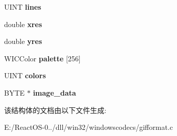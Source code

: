\begin{DoxyCompactItemize}
U\+I\+NT {\bfseries lines}
\item 
\mbox{\label{struct_gif_frame_encode_ab1c397b05cb033bc920f030285635e03}} 
double {\bfseries xres}
\item 
\mbox{\label{struct_gif_frame_encode_a4b5109bcaa15e3de41dbfead0dbe93da}} 
double {\bfseries yres}
\item 
\mbox{\label{struct_gif_frame_encode_a0ee0ee0d1065778152a1e1e5784e276a}} 
W\+I\+C\+Color {\bfseries palette} \mbox{[}256\mbox{]}
\item 
\mbox{\label{struct_gif_frame_encode_ad01a4e85bb1f9fc437c57ac78b2c9506}} 
U\+I\+NT {\bfseries colors}
\item 
\mbox{\label{struct_gif_frame_encode_a51c6f15ae3276766e063793bd5a7fb07}} 
B\+Y\+TE $\ast$ {\bfseries image\+\_\+data}
\end{DoxyCompactItemize}


该结构体的文档由以下文件生成\+:\begin{DoxyCompactItemize}
\item 
E\+:/\+React\+O\+S-\/0../dll/win32/windowscodecs/gifformat.\+c\end{DoxyCompactItemize}
